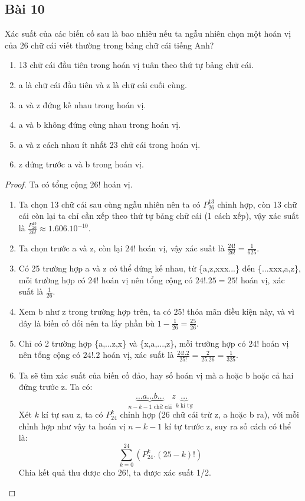 \subsection*{Bài 10}
Xác suất của các biến cố sau là bao nhiêu nếu ta ngẫu nhiên chọn một hoán vị của 26 chữ cái viết thường trong bảng chữ cái tiếng Anh?
\begin{enumerate}[label=\alph*)]
    \item 13 chữ cái đầu tiên trong hoán vị tuân theo thứ tự bảng chữ cái.
    \item a là chữ cái đầu tiên và z là chữ cái cuối cùng.
    \item a và z đứng kế nhau trong hoán vị.
    \item a và b không đứng cùng nhau trong hoán vị.
    \item a và z cách nhau ít nhất 23 chữ cái trong hoán vị.
    \item z đứng trước a và b trong hoán vị.
\end{enumerate}
\begin{proof}
    Ta có tổng cộng 26! hoán vị.
    \begin{enumerate}[label=\alph*)]
        \item Ta chọn 13 chữ cái sau cùng ngẫu nhiên nên ta có $P^{13}_{26}$ chỉnh hợp, còn 13 chữ cái còn lại ta chỉ cần xếp theo thứ tự bảng chữ cái (1 cách xếp), vậy xác suất là $\frac{P^{13}_{26}}{26!}\approx1.606.10^{-10}$.
        \item Ta chọn trước a và z, còn lại $24!$ hoán vị, vậy xác suất là $\frac{24!}{26!}=\frac{1}{625}$.
        \item Có 25 trường hợp a và z có thể đứng kế nhau, từ \{a,z,xxx...\} đến \{...xxx,a,z\}, mỗi trường hợp có $24!$ hoán vị nên tổng cộng có $24!.25=25!$ hoán vị, xác suất là $\frac{1}{26}$.
        \item Xem b như z trong trường hợp trên, ta có $25!$ thỏa mãn điều kiện này, và vì đây là biến cố đối nên ta lấy phần bù $1-\frac{1}{26}=\frac{25}{26}$.
        \item Chỉ có 2 trường hợp \{a,...z,x\} và \{x,a,...,z\}, mỗi trường hợp có $24!$ hoán vị nên tổng cộng có $24!.2$ hoán vị, xác suất là $\frac{24!.2}{25!}=\frac{2}{25.26}=\frac{1}{325}$.
        \item Ta sẽ tìm xác suất của biến cố đảo, hay số hoán vị mà a hoặc b hoặc cả hai đứng trước z. Ta có:
        $$\underbrace{\dots a\dots b\dots}_{n-k-1\text{ chữ cái}}z\underbrace{\dots}_{k\text{ kí tự}}$$
        Xét $k$ kí tự sau z, ta có $P^{k}_{24}$ chỉnh hợp (26 chữ cái trừ z, a hoặc b ra), với mỗi chỉnh hợp như vậy ta hoán vị $n-k-1$ kí tự trước z, suy ra số cách có thể là: $$\sum_{k=0}^{24}(P^k_{24}.(25-k)!)$$
        Chia kết quả thu được cho $26!$, ta được xác suất 1/2.
    \end{enumerate}
\end{proof}
